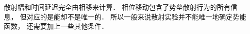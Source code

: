 
\begin{issues}
\issueDraft
\end{issues}

散射幅和时间延迟完全由相移来计算． 相位移动包含了势垒散射行为的所有信息， 但对应的是能却不是唯一的． 所以一般来说散射实验并不能唯一地确定势能函数， 还需要加上一些其他条件．
